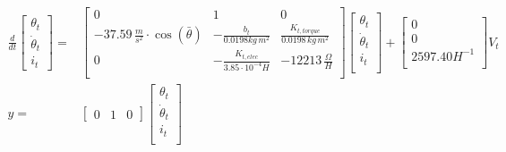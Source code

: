 \documentclass[../../main]{subfiles}
\begin{document}
\begin{equation}
      \label{eq:Theoretical_models_top}
      \begin{split}
      \frac{d}{dt}
          \begin{bmatrix}
              \theta_t \\
              \dot \theta_t \\
              i_t
          \end{bmatrix}
              =&
          \begin{bmatrix}
              0                                                   & 1                         & 0                             \\
              -37.59 \, \si{\frac{m}{s^2}} \cdot \cos(\bar \theta) & -\frac{b_t}{0.0198 \si{kg\,m^2} }  & \frac{K_{t,torque}}{0.0198 \si{\,kg\,m^2}} \\
              0    & -\frac{K_{t,elec}}{3.85\cdot 10^{-4}\si{H}}  & -12213 \si{\, \frac{\Omega}{H}}              \\
          \end{bmatrix}
          \begin{bmatrix}
              \theta_t      \\
              \dot \theta_t \\
              i_t           \\
          \end{bmatrix}
              +
          \begin{bmatrix}
              0             \\
              0             \\
              2597.40 \si{H^{-1}} \\
          \end{bmatrix}
              V_t
\\
          y =&
          \begin{bmatrix}
              0 & 1 & 0
          \end{bmatrix}
          \begin{bmatrix}
              \theta_t      \\
              \dot \theta_t \\
              i_t           \\
          \end{bmatrix}
    \end{split}
\end{equation}
\end{document}

